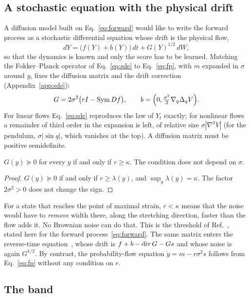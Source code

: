 \subsection{A stochastic equation with the physical drift}

A diffusion model built on Eq.~\eqref{eq:forward} would like to write the forward process as a stochastic differential equation whose drift is the physical flow,
\begin{equation}
dY = \big(f(Y) + b(Y)\big)\,dt + G(Y)^{1/2}\, dW,
\label{eq:sde}
\end{equation}
so that the dynamics is known and only the score has to be learned. Matching the Fokker--Planck operator of Eq.~\eqref{eq:sde} to Eq.~\eqref{eq:fp}, with $m$ expanded in $\sigma$ around $y$, fixes the diffusion matrix and the drift correction (Appendix~\ref{app:sde}):
\begin{equation}
G = 2\sigma^2\big(rI - \operatorname{Sym} Df\big), \qquad b = \Big(0, \tfrac{\sigma^2}{2}\nabla_q \Delta_q V\Big).
\label{eq:G}
\end{equation}
For linear flows Eq.~\eqref{eq:sde} reproduces the law of $Y_t$ exactly; for nonlinear flows a remainder of third order in the expansion is left, of relative size $\sigma|\nabla^3 V|$ (for the pendulum, $\sigma|\sin q|$, which vanishes at the top). A diffusion matrix must be positive semidefinite.

\begin{proposition}[threshold (I)]
\label{prop:sde}
$G(y) \succeq 0$ for every $y$ if and only if $r \geq \kappa$. The condition does not depend on $\sigma$.
\end{proposition}
\begin{proof}
$G(y) \succeq 0$ if and only if $r \geq \lambda(y)$, and $\sup_y \lambda(y) = \kappa$. The factor $2\sigma^2 > 0$ does not change the sign.
\end{proof}
For a state that reaches the point of maximal strain, $r < \kappa$ means that the noise would have to \emph{remove} width there, along the stretching direction, faster than the flow adds it. No Brownian noise can do that. This is the threshold of Ref.~\cite{namba2026threshold}, stated here for the forward process~\eqref{eq:forward}. The same matrix enters the reverse-time equation~\cite{anderson1982,song2021}, whose drift is $f + b - \operatorname{div} G - G s$ and whose noise is again $G^{1/2}$. By contrast, the probability-flow equation $\dot y = m - r\sigma^2 s$ follows from Eq.~\eqref{eq:fp} without any condition on $r$.

\subsection{The band}

